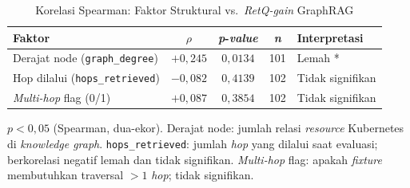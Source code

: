\renewcommand{\arraystretch}{1.3}
\captionsetup[table]{justification=raggedright,singlelinecheck=false}
\begin{table}[H]
\caption{Korelasi Spearman: Faktor Struktural vs.\ \textit{RetQ-gain} GraphRAG}
\label{tbl:spearman_factors}
\centering
\begin{tabular}{| p{} | c | c | c | p{} |}
\hline
\textbf{Faktor} & \textbf{$\rho$} & \textbf{\textit{p}-\textit{value}} & \textbf{\textit{n}} & \textbf{Interpretasi} \\
\hline
Derajat node (\texttt{graph\_degree}) & $+0{,}245$ & $0{,}0134$ & 101 & Lemah * \\
\hline
Hop dilalui (\texttt{hops\_retrieved}) & $-0{,}082$ & $0{,}4139$ & 102 & Tidak signifikan \\
\hline
\textit{Multi-hop} flag (0/1) & $+0{,}087$ & $0{,}3854$ & 102 & Tidak signifikan \\
\hline
\end{tabular}
\end{table}
{\small\noindent * $p<0{,}05$ (Spearman, dua-ekor). Derajat node: jumlah relasi \textit{resource} Kubernetes di \textit{knowledge graph}. \texttt{hops\_retrieved}: jumlah \textit{hop} yang dilalui saat evaluasi; berkorelasi negatif lemah dan tidak signifikan. \textit{Multi-hop} flag: apakah \textit{fixture} membutuhkan traversal $>1$ \textit{hop}; tidak signifikan.}
